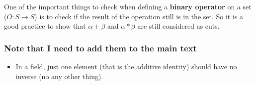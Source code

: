 One of the important things to check when defining a \textbf{binary operator} on a set ($O: S \rightarrow S$) is to check if the result of the operation still is in the set. So it is a good practice to show that $\alpha + \beta$ and $\alpha * \beta$ are still considered as cuts. 


\subsubsection{Note that I need to add them to the main text}
\begin{itemize}
	\item In a field, just one element (that is the additive identity) should have no inverse (no any other thing).
\end{itemize}

